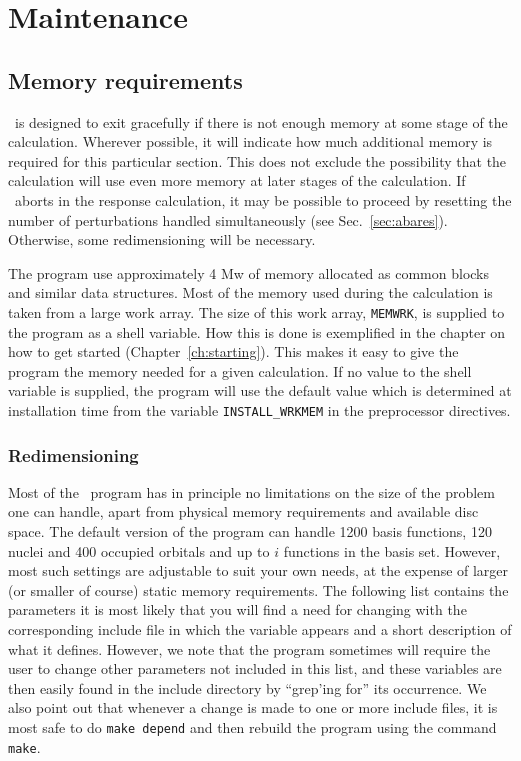 \chapter{Maintenance}\label{ch:maintain}

\section{Memory requirements}

\dalton\ is designed to exit gracefully if there is not enough
memory at some stage of the calculation.  Wherever possible, it
will indicate how much additional memory is required for this
particular section.  This does not exclude the possibility that
the calculation will use even more memory at later stages of the
calculation. If \dalton\ aborts in the response calculation, it
may be possible to proceed by resetting the number of
perturbations handled simultaneously (see 
Sec.~\ref{sec:abares}).  Otherwise, some redimensioning will be
necessary.

The program use approximately 4 Mw of memory allocated as common
blocks and similar data structures. Most of the memory used during the
calculation is taken from a large work array. The size of this work
array,
\verb|MEMWRK|, is supplied to the program as a shell
variable. How this is done is
exemplified in the chapter on how to get started
(Chapter~\ref{ch:starting}). This makes it easy
to give the program the memory needed for a given calculation. If no
value to the shell 
variable is supplied, the program will use the  default value which is
determined at installation time from the variable
\verb|INSTALL_WRKMEM| in the preprocessor
directives.

\subsection{Redimensioning \dalton}

Most of the \dalton\ program has in principle no limitations on
the size of the problem one can handle, apart from
physical memory requirements and available disc space. The default
version of the program can handle 1200 basis functions, 120 nuclei and
400 occupied orbitals and up to $i$ functions in the basis
set. However, most such settings are adjustable to suit your own
needs, at the expense of larger (or smaller of course) static memory
requirements. The following list contains the parameters it is
most likely that you will find a need for changing with the
corresponding include 
file in which the variable appears and a short description of what
it defines. However, we note that the program sometimes will
require the user to change other parameters not included in this
list, and these variables are then easily found in the include
directory by ``grep'ing for'' its occurrence. We also point out that
whenever a change is made to one or more include files, it is most
safe to do \verb|make depend| and then rebuild the program using the
command \verb|make|.


